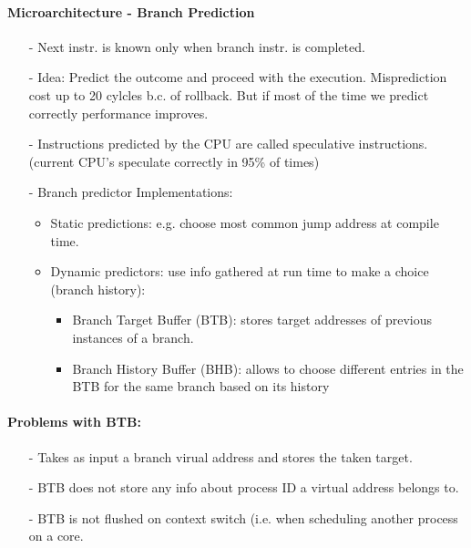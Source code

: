 \paragraph{Microarchitecture - Branch Prediction}
\begin{itemize}
    \item[-]Next instr. is known only when branch instr. is completed.
    \item[-]Idea: Predict the outcome and proceed with the execution. Misprediction cost up to 20 cylcles b.c. of rollback. But if most of the time we predict correctly performance improves.
    \item[-]Instructions predicted by the CPU are called speculative instructions. (current CPU's speculate correctly in 95\% of times)
    \item[-]Branch predictor Implementations:
    \begin{itemize}
        \item Static predictions: e.g. choose most common jump address at compile time.
        \item Dynamic predictors: use info gathered at run time to make a choice (branch history):
        \begin{itemize}
            \item Branch Target Buffer (BTB): stores target addresses of previous instances of a branch.
            \item Branch History Buffer (BHB): allows to choose different entries in the BTB for the same branch based on its history
        \end{itemize}
    \end{itemize}
\end{itemize}

\paragraph{Problems with BTB: }
\begin{itemize}
    \item[-]Takes as input a branch virual address and stores the taken target.
    \item[-]BTB does not store any info about process ID a virtual address belongs to.
    \item[-]BTB is not flushed on context switch (i.e. when scheduling another process on a core.
\end{itemize}

